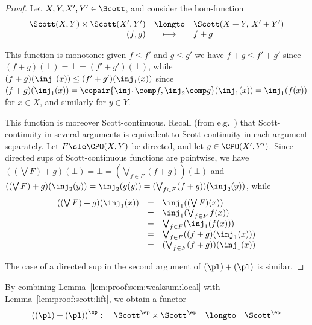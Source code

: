 \begin{proof}
Let $X,Y,X',Y' \in \Scott$,
and consider the hom-function
\[
\begin{array}{r c l}
  \Scott(X,Y) \times \Scott(X',Y')
& \longto
& \Scott(X+Y,\, X' + Y')
\\
%
  (f,g)
& \longmapsto
& f + g
\end{array}
\]

This function is monotone: given $f \leq f'$ and $g \leq g'$
we have
$f+g \leq f' + g'$
since
\(
  (f + g)(\bot)
  =
  \bot
  =
  (f' + g')(\bot)
\),
while 
\(
  (f + g)(\inj_1(x))
  \leq
  (f' + g')(\inj_1(x))
\)
since
\(
  (f + g)(\inj_1(x))
  =
  \copair{{\inj_1} \comp f, {\inj_2} \comp g}(\inj_1(x))
  =
  \inj_1(f(x))
\)
for $x \in X$,
and similarly for $y \in Y$.

This function is moreover Scott-continuous.
Recall (from e.g.~\cite[Proposition 1.4.3]{ac98book})
that Scott-continuity in several arguments is equivalent
to Scott-continuity in each argument separately.
Let $F \sle \CPO(X,Y)$ be directed, and let $g \in \CPO(X',Y')$.
Since directed sups of Scott-continuous functions are pointwise,
we have $((\bigvee F) + g)(\bot) = \bot = (\bigvee_{f \in F}(f+g))(\bot)$
and
$((\bigvee F) + g)(\inj_2(y)) = \inj_2(g(y)) = (\bigvee_{f \in F}(f+g))(\inj_2(y))$,
while
\[
\begin{array}{l l l}
  ((\bigvee F) + g)(\inj_1(x))
& =
& \inj_1((\bigvee F)(x))
\\
%
& =
& \inj_1(\bigvee_{f \in F}f(x))
\\
%
& =
& \bigvee_{f \in F}(\inj_1(f(x)))
\\
%
& =
& \bigvee_{f \in F}((f+g)(\inj_1(x)))
\\
%
& =
& (\bigvee_{f \in F}(f+g))(\inj_1(x))
\end{array}
\]

The case of a directed sup in the second argument of $(\pl) + (\pl)$
is similar.
\end{proof}

By combining Lemma~\ref{lem:proof:sem:weaksum:local}
with Lemma~\ref{lem:proof:scott:lift},
we obtain a functor
\[
\begin{array}{*{4}{l}}
  \left( (\pl) + (\pl) \right)^\ep
  \colon
& \Scott^\ep \times \Scott^\ep
& \longto
& \Scott^\ep
\end{array}
\]


